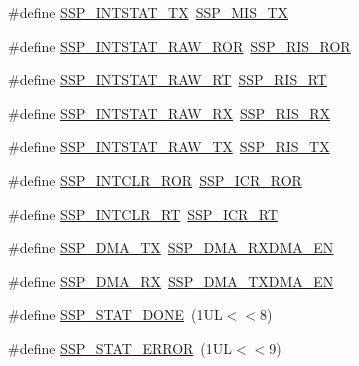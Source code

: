 \begin{DoxyCompactItemize}
\item 
\#define \hyperlink{group___s_s_p___public___macros_ga76c22817987e49834f2280f48c7b3c64}{S\+S\+P\+\_\+\+I\+N\+T\+S\+T\+A\+T\+\_\+\+TX}~\hyperlink{group___s_s_p___private___macros_ga1db3ebd72dfe222733297a3fb5ca37af}{S\+S\+P\+\_\+\+M\+I\+S\+\_\+\+TX}
\item 
\#define \hyperlink{group___s_s_p___public___macros_gafee0d65700b9a2ef6e508755bfacb32e}{S\+S\+P\+\_\+\+I\+N\+T\+S\+T\+A\+T\+\_\+\+R\+A\+W\+\_\+\+R\+OR}~\hyperlink{group___s_s_p___private___macros_ga0556e3aaa7aefef2c8ed76e1efbf277c}{S\+S\+P\+\_\+\+R\+I\+S\+\_\+\+R\+OR}
\item 
\#define \hyperlink{group___s_s_p___public___macros_gaa7d981043c996b7721a7c729d0c065df}{S\+S\+P\+\_\+\+I\+N\+T\+S\+T\+A\+T\+\_\+\+R\+A\+W\+\_\+\+RT}~\hyperlink{group___s_s_p___private___macros_gaf3ca75688f2b02dc4df0c1812d246baf}{S\+S\+P\+\_\+\+R\+I\+S\+\_\+\+RT}
\item 
\#define \hyperlink{group___s_s_p___public___macros_gaf52e1a3479fa4d119a298302ca1a3e9e}{S\+S\+P\+\_\+\+I\+N\+T\+S\+T\+A\+T\+\_\+\+R\+A\+W\+\_\+\+RX}~\hyperlink{group___s_s_p___private___macros_gad5b9b44272a78e2dcfa4f11b560a1ac5}{S\+S\+P\+\_\+\+R\+I\+S\+\_\+\+RX}
\item 
\#define \hyperlink{group___s_s_p___public___macros_ga45e392f2778d7ad3ddc710006ce16c96}{S\+S\+P\+\_\+\+I\+N\+T\+S\+T\+A\+T\+\_\+\+R\+A\+W\+\_\+\+TX}~\hyperlink{group___s_s_p___private___macros_gaf2019e37460395bc0ee5fe12cd6e2226}{S\+S\+P\+\_\+\+R\+I\+S\+\_\+\+TX}
\item 
\#define \hyperlink{group___s_s_p___public___macros_gab79665cc09989a9730abb6b5452df1d7}{S\+S\+P\+\_\+\+I\+N\+T\+C\+L\+R\+\_\+\+R\+OR}~\hyperlink{group___s_s_p___private___macros_ga12339c82c252077d3c53bad546a68c75}{S\+S\+P\+\_\+\+I\+C\+R\+\_\+\+R\+OR}
\item 
\#define \hyperlink{group___s_s_p___public___macros_ga36b024118d27e68540e8e403b897ed75}{S\+S\+P\+\_\+\+I\+N\+T\+C\+L\+R\+\_\+\+RT}~\hyperlink{group___s_s_p___private___macros_ga6917b6687bd6c914134afe3d86b10fb0}{S\+S\+P\+\_\+\+I\+C\+R\+\_\+\+RT}
\item 
\#define \hyperlink{group___s_s_p___public___macros_ga442c2b693b567292aaa17bdba6789094}{S\+S\+P\+\_\+\+D\+M\+A\+\_\+\+TX}~\hyperlink{group___s_s_p___private___macros_ga0508ccc6f92325452fb24fa4d7a4c202}{S\+S\+P\+\_\+\+D\+M\+A\+\_\+\+R\+X\+D\+M\+A\+\_\+\+EN}
\item 
\#define \hyperlink{group___s_s_p___public___macros_gac294ff35d73ad16084bd157fec3bcfc6}{S\+S\+P\+\_\+\+D\+M\+A\+\_\+\+RX}~\hyperlink{group___s_s_p___private___macros_gaafe065e1865ad37d436c5f000f9653ab}{S\+S\+P\+\_\+\+D\+M\+A\+\_\+\+T\+X\+D\+M\+A\+\_\+\+EN}
\item 
\#define \hyperlink{group___s_s_p___public___macros_ga50dbb53cd4d651137a9826f1cee0156b}{S\+S\+P\+\_\+\+S\+T\+A\+T\+\_\+\+D\+O\+NE}~(1\+U\+L$<$$<$8)
\item 
\#define \hyperlink{group___s_s_p___public___macros_ga6fadaf52886e10c84c3461b43c216de4}{S\+S\+P\+\_\+\+S\+T\+A\+T\+\_\+\+E\+R\+R\+OR}~(1\+U\+L$<$$<$9)
\end{DoxyCompactItemize}


